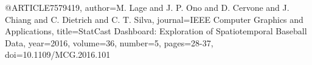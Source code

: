 @ARTICLE{7579419,
  author={M. {Lage} and J. P. {Ono} and D. {Cervone} and J. {Chiang} and C. {Dietrich} and C. T. {Silva}},
  journal={IEEE Computer Graphics and Applications}, 
  title={StatCast Dashboard: Exploration of Spatiotemporal Baseball Data}, 
  year={2016},
  volume={36},
  number={5},
  pages={28-37},
  doi={10.1109/MCG.2016.101}}